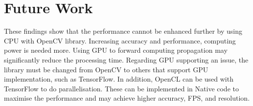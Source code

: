     \section{Future Work}
        These findings show that the performance cannot be enhanced further by using CPU with OpenCV library.
        Increasing accuracy and performance, computing power is needed more.
        Using GPU to forward computing propagation may significantly reduce the processing time.
        Regarding GPU supporting an issue, the library must be changed from OpenCV to others that support
        GPU implementation, such as TensorFlow.
        In addition, OpenCL can be used with TensorFlow to do parallelisation.
        These can be implemented in Native code to maximise the performance
        and may achieve higher accuracy, FPS, and resolution.

